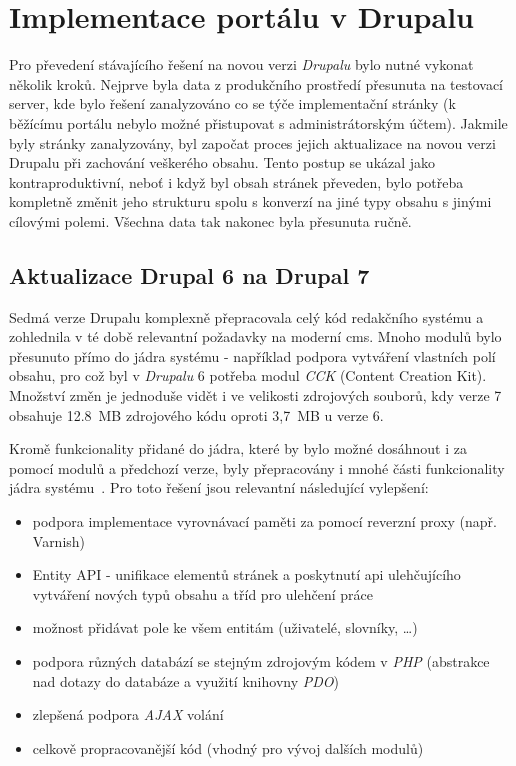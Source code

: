 \chapter{Implementace portálu v Drupalu}
\label{chap:implementace-drupal}

Pro převedení stávajícího řešení na novou verzi \emph{Drupalu} bylo nutné vykonat několik kroků. Nejprve byla data z produkčního prostředí přesunuta na testovací server, kde bylo řešení zanalyzováno co se týče implementační stránky (k běžícímu portálu nebylo možné přistupovat s administrátorským účtem). Jakmile byly stránky zanalyzovány, byl započat proces jejich aktualizace na novou verzi Drupalu při zachování veškerého obsahu. Tento postup se ukázal jako kontraproduktivní, neboť i když byl obsah stránek převeden, bylo potřeba kompletně změnit jeho strukturu spolu s konverzí na jiné typy obsahu s jinými cílovými polemi. Všechna data tak nakonec byla přesunuta ručně.

\section{Aktualizace Drupal 6 na Drupal 7}
\label{sec:aktualizace}
Sedmá verze Drupalu komplexně přepracovala celý kód redakčního systému a zohlednila v té době relevantní požadavky na moderní \gls{cms}. Mnoho modulů bylo přesunuto přímo do jádra systému - například podpora vytváření vlastních polí obsahu, pro což byl v \emph{Drupalu} 6 potřeba modul \emph{CCK} (Content Creation Kit). Množství změn je jednoduše vidět i ve velikosti zdrojových souborů, kdy verze 7 obsahuje 12.8~MB zdrojového kódu oproti 3,7~MB u verze 6.

Kromě funkcionality přidané do jádra, které by bylo možné dosáhnout i za pomocí modulů a předchozí verze, byly přepracovány i mnohé části funkcionality jádra systému~\cite{website:drupal-comparison}. Pro toto řešení jsou relevantní následující vylepšení:

\begin{itemize}
  \item podpora implementace vyrovnávací paměti za pomocí reverzní proxy (např. Varnish)
  \item Entity API - unifikace elementů stránek a poskytnutí \gls{api} ulehčujícího vytváření nových typů obsahu a tříd pro ulehčení práce~\cite{drupal-entities}
  \item možnost přidávat pole ke všem entitám (uživatelé, slovníky, \dots)
  \item podpora různých databází se stejným zdrojovým kódem v \emph{PHP} (abstrakce nad dotazy do databáze a využití knihovny \emph{PDO})
  \item zlepšená podpora \emph{AJAX} volání
  \item celkově propracovanější kód (vhodný pro vývoj dalších modulů)
\end{itemize}


